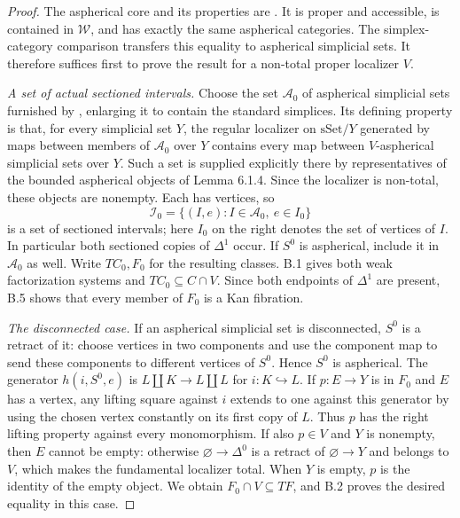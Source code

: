 \begin{proof}
The aspherical core and its properties are
\citet[6.1.7, Proposition 6.1.8 and Theorem 6.1.11]{Cisinski2006B}.
It is proper and accessible, is contained in $\mathcal W$, and has exactly
the same aspherical categories.  The simplex-category comparison transfers
this equality to aspherical simplicial sets.  It therefore suffices first
to prove the result for a non-total proper localizer $V$.

\emph{A set of actual sectioned intervals.}
Choose the set $\mathcal A_0$ of aspherical simplicial sets furnished by
\citet[Lemma 6.1.6]{Cisinski2006B}, enlarging it to contain the standard
simplices.  Its defining property is that, for every simplicial set $Y$,
the regular localizer on $\mathrm{sSet}/Y$ generated by maps between
members of $\mathcal A_0$ over $Y$ contains every map between
$V$-aspherical simplicial sets over $Y$.  Such a set is supplied explicitly
there by representatives of the bounded aspherical objects of Lemma 6.1.4.
Since the localizer is non-total, these objects are nonempty.  Each has
vertices, so
\[
 \mathcal I_0=\{(I,e):I\in\mathcal A_0,\ e\in I_0\}
\]
is a set of sectioned intervals; here $I_0$ on the right denotes the set of
vertices of $I$.  In particular both sectioned copies of $\Delta^1$ occur.
If $S^0$ is aspherical, include it in $\mathcal A_0$ as well.  Write
$TC_0,F_0$ for the resulting classes.  B.1 gives both weak factorization
systems and $TC_0\subseteq C\cap V$.  Since both endpoints of $\Delta^1$
are present, B.5 shows that every member of $F_0$ is a Kan fibration.

\emph{The disconnected case.}
If an aspherical simplicial set is disconnected, $S^0$ is a retract of it:
choose vertices in two components and use the component map to send these
components to different vertices of $S^0$.  Hence $S^0$ is aspherical.
The generator $h(i,S^0,e)$ is $L\amalg K\to L\amalg L$ for
$i:K\hookrightarrow L$.  If $p:E\to Y$ is in $F_0$ and $E$ has a vertex,
any lifting square against $i$ extends to one against this generator by
using the chosen vertex constantly on its first copy of $L$.  Thus $p$
has the right lifting property against every monomorphism.
If also $p\in V$ and $Y$ is nonempty, then $E$ cannot be empty: otherwise
$\varnothing\to\Delta^0$ is a retract of $\varnothing\to Y$ and belongs
to $V$, which makes the fundamental localizer total.  When $Y$ is empty,
$p$ is the identity of the empty object.  We obtain
$F_0\cap V\subseteq TF$, and B.2 proves the desired equality in this case.


\end{proof}
